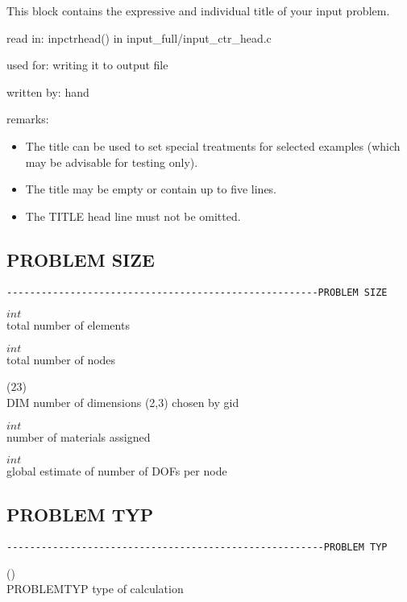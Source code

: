 This block contains the expressive and individual title of your input
problem. 

read in: inpctrhead() in input\_full/input\_ctr\_head.c 

used for: writing it to output file 

written by: hand 


remarks: 

\begin{itemize}
\item The title can be used to set special treatments for selected examples
(which may be advisable for testing only). 
\item The title may be empty or contain up to five lines. 
\item The TITLE head line must not be omitted.
\end{itemize}

\subsection{PROBLEM SIZE}
\begin{verbatim}
------------------------------------------------------PROBLEM SIZE
\end{verbatim}

 $int$\\
total number of elements

 $int$\\
total number of nodes

 ($2$\kor$3$)\\
DIM number of dimensions (2,3) chosen by gid

 $int$\\
number of materials assigned

 $int$\\
global estimate of number of DOFs per node

\subsection{PROBLEM TYP}
\begin{verbatim}
-------------------------------------------------------PROBLEM TYP
\end{verbatim}

 (\kor{}\kor{}\kor{}\kor{})\\
PROBLEMTYP type of calculation

